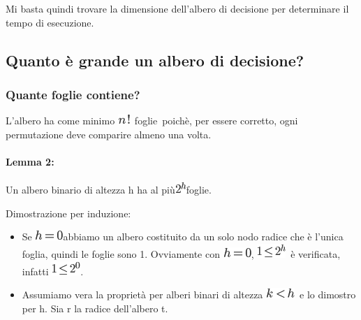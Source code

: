 \documentclass{article}
\providecommand{\tightlist}{%
  \setlength{\itemsep}{0pt}\setlength{\parskip}{0pt}}
\let\oldparagraph\paragraph
\renewcommand{\paragraph}[1]{\oldparagraph{#1}\mbox{}}
\begin{document}
{Mi basta quindi trovare la dimensione dell'albero di decisione per
determinare il tempo di esecuzione.}

\hypertarget{h.prflgx3s7s1g}{\subsection{\texorpdfstring{{Quanto è grande un albero di decisione?}}{Quanto è grande un albero di decisione?}}\label{h.prflgx3s7s1g}}

\hypertarget{h.cphw2k3mqktf}{\subsubsection{\texorpdfstring{{Quante foglie contiene?}}{Quante foglie contiene?}}\label{h.cphw2k3mqktf}}

{L'albero ha come minimo }\includegraphics{images/image160.png}{~foglie}{~poichè, per essere
corretto, ogni permutazione deve comparire almeno una volta.}

\hypertarget{h.yiy1tipj4aof}{\paragraph{\texorpdfstring{{Lemma
2:}}{Lemma 2:}}\label{h.yiy1tipj4aof}}

{Un albero binario di altezza h ha al più}\includegraphics{images/image161.png}{foglie.}

{Dimostrazione per induzione:}

\begin{itemize}
\tightlist
\item
  {Se }\includegraphics{images/image162.png}{abbiamo un albero
  costituito da un solo nodo radice che è l'unica foglia, quindi le
  foglie sono 1. Ovviamente con }\includegraphics{images/image162.png}{,
  }\includegraphics{images/image163.png}{~è verificata, infatti
  }\includegraphics{images/image164.png}{.}
\item
  {Assumiamo vera la proprietà per alberi binari di altezza
  }\includegraphics{images/image165.png}{~e lo dimostro per h. Sia r la
  radice dell'albero t. }
\end{itemize}
\end{document}
